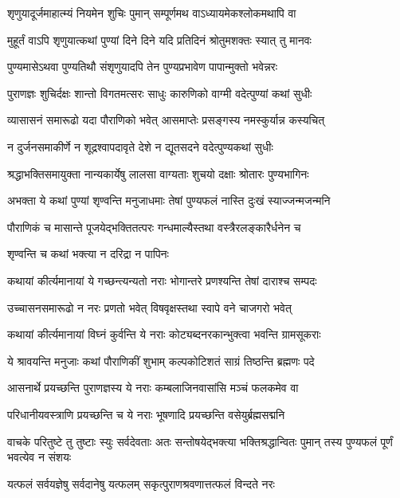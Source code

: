 \twolineshloka
{शृणुयादूर्जमाहात्म्यं नियमेन शुचिः पुमान्}
{सम्पूर्णमथ वाऽध्यायमेकश्लोकमथापि वा} %

\twolineshloka
{मुहूर्तं वाऽपि शृणुयात्कथां पुण्यां दिने दिने}
{यदि प्रतिदिनं श्रोतुमशक्तः स्यात् तु मानवः} %

\twolineshloka
{पुण्यमासेऽथवा पुण्यतिथौ संशृणुयादपि}
{तेन पुण्यप्रभावेण पापान्मुक्तो भवेन्नरः} %

\twolineshloka
{पुराणज्ञः शुचिर्दक्षः शान्तो विगतमत्सरः}
{साधुः कारुणिको वाग्मी वदेत्पुण्यां कथां सुधीः} %

\twolineshloka
{व्यासासनं समारूढो यदा पौराणिको भवेत्}
{आसमाप्तेः प्रसङ्गस्य नमस्कुर्यान्न कस्यचित्} %

\twolineshloka
{न दुर्जनसमाकीर्णे न शूद्रश्वापदावृते}
{देशे न द्यूतसदने वदेत्पुण्यकथां सुधीः} %

\twolineshloka
{श्रद्धाभक्तिसमायुक्ता नान्यकार्येषु लालसा}
{वाग्यताः शुचयो दक्षाः श्रोतारः पुण्यभागिनः} %

\twolineshloka
{अभक्ता ये कथां पुण्यां शृण्वन्ति मनुजाधमाः}
{तेषां पुण्यफलं नास्ति दुःखं स्याज्जन्मजन्मनि} %

\twolineshloka
{पौराणिकं च मासान्ते पूजयेद्भक्तितत्परः}
{गन्धमाल्यैस्तथा वस्त्रैरलङ्कारैर्धनेन च} %


\onelineshloka
{शृण्वन्ति च कथां भक्त्या न दरिद्रा न पापिनः} %

\twolineshloka
{कथायां कीर्त्यमानायां ये गच्छन्त्यन्यतो नराः}
{भोगान्तरे प्रणश्यन्ति तेषां दाराश्च सम्पदः} %

\twolineshloka
{उच्चासनसमारूढो न नरः प्रणतो भवेत्}
{विषवृक्षस्तथा स्वापे वने चाजगरो भवेत्} %

\twolineshloka
{कथायां कीर्त्यमानायां विघ्नं कुर्वन्ति ये नराः}
{कोट्यब्दनरकान्भुक्त्वा भवन्ति ग्रामसूकराः} %

\twolineshloka
{ये श्रावयन्ति मनुजाः कथां पौराणिकीं शुभाम्}
{कल्पकोटिशतं साग्रं तिष्ठन्ति ब्रह्मणः पदे} %

\twolineshloka
{आसनार्थे प्रयच्छन्ति पुराणज्ञस्य ये नराः}
{कम्बलाजिनवासांसि मञ्चं फलकमेव वा} %

\twolineshloka
{परिधानीयवस्त्राणि प्रयच्छन्ति च ये नराः}
{भूषणादि प्रयच्छन्ति वसेयुर्ब्रह्मसद्मनि} %

\threelineshloka
{वाचके परितुष्टे तु तुष्टाः स्युः सर्वदेवताः}
{अतः सन्तोषयेद्भक्त्या भक्तिश्रद्धान्वितः पुमान्}
{तस्य पुण्यफलं पूर्णं भवत्येव न संशयः} %

\twolineshloka
{यत्फलं सर्वयज्ञेषु सर्वदानेषु यत्फलम्}
{सकृत्पुराणश्रवणात्तत्फलं विन्दते नरः} %

